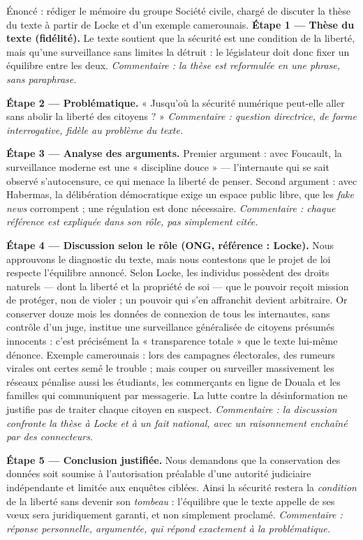 \documentclass[11pt]{article}
\begin{document}
\begin{exoresolu}
Énoncé : rédiger le mémoire du groupe Société civile, chargé de discuter la thèse du texte à partir de Locke et d'un exemple camerounais.
\tcblower
\textbf{Étape 1 — Thèse du texte (fidélité).} Le texte soutient que la sécurité est une condition de la liberté, mais qu'une surveillance sans limites la détruit : le législateur doit donc fixer un équilibre entre les deux. \emph{Commentaire : la thèse est reformulée en une phrase, sans paraphrase.}

\textbf{Étape 2 — Problématique.} « Jusqu'où la sécurité numérique peut-elle aller sans abolir la liberté des citoyens ? » \emph{Commentaire : question directrice, de forme interrogative, fidèle au problème du texte.}

\textbf{Étape 3 — Analyse des arguments.} Premier argument : avec Foucault, la surveillance moderne est une « discipline douce » — l'internaute qui se sait observé s'autocensure, ce qui menace la liberté de penser. Second argument : avec Habermas, la délibération démocratique exige un espace public libre, que les \emph{fake news} corrompent ; une régulation est donc nécessaire. \emph{Commentaire : chaque référence est expliquée dans son rôle, pas simplement citée.}

\textbf{Étape 4 — Discussion selon le rôle (ONG, référence : Locke).} Nous approuvons le diagnostic du texte, mais nous contestons que le projet de loi respecte l'équilibre annoncé. Selon Locke, les individus possèdent des droits naturels — dont la liberté et la propriété de soi — que le pouvoir reçoit mission de protéger, non de violer ; un pouvoir qui s'en affranchit devient arbitraire. Or conserver douze mois les données de connexion de tous les internautes, sans contrôle d'un juge, institue une surveillance généralisée de citoyens présumés innocents : c'est précisément la « transparence totale » que le texte lui-même dénonce. Exemple camerounais : lors des campagnes électorales, des rumeurs virales ont certes semé le trouble ; mais couper ou surveiller massivement les réseaux pénalise aussi les étudiants, les commerçants en ligne de Douala et les familles qui communiquent par messagerie. La lutte contre la désinformation ne justifie pas de traiter chaque citoyen en suspect. \emph{Commentaire : la discussion confronte la thèse à Locke et à un fait national, avec un raisonnement enchaîné par des connecteurs.}

\textbf{Étape 5 — Conclusion justifiée.} Nous demandons que la conservation des données soit soumise à l'autorisation préalable d'une autorité judiciaire indépendante et limitée aux enquêtes ciblées. Ainsi la sécurité restera la \emph{condition} de la liberté sans devenir son \emph{tombeau} : l'équilibre que le texte appelle de ses vœux sera juridiquement garanti, et non simplement proclamé. \emph{Commentaire : réponse personnelle, argumentée, qui répond exactement à la problématique.}
\end{exoresolu}
\end{document}
